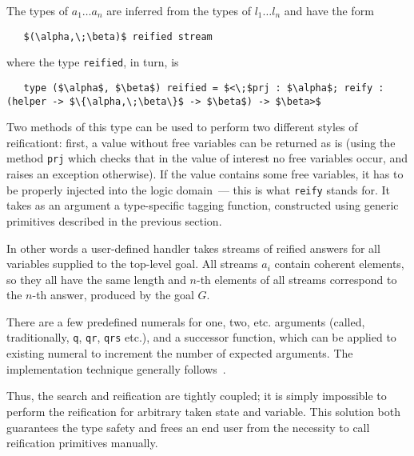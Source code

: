 The types of \mbox{$a_1\dots a_n$} are inferred from the types of \mbox{$l_1\dots l_n$} and
have the form

\begin{lstlisting}
   $(\alpha,\;\beta)$ reified stream
\end{lstlisting}

\noindent where the type \lstinline{reified}, in turn, is

\begin{lstlisting}
   type ($\alpha$, $\beta$) reified = $<\;$prj : $\alpha$; reify : (helper -> $\{\alpha,\;\beta\}$ -> $\beta$) -> $\beta>$
\end{lstlisting}

Two methods of this type can be used to perform two different styles of reificationt: first, a value without
free variables can be returned as is (using the method \lstinline{prj} which checks that in the value of
interest no free variables occur, and raises an exception otherwise). If the value contains some free
variables, it has to be properly injected into the logic domain~--- this is what \lstinline{reify} stands
for. It takes as an argument a type-specific tagging function, constructed using generic
primitives described in the previous section.

In other words a user-defined handler takes streams of reified answers for all variables supplied to the top-level
goal. All streams $a_i$ contain coherent elements, so they all have the same length and $n$-th elements of all
streams correspond to the $n$-th answer, produced by the goal $G$.

There are a few predefined numerals for one, two, etc. arguments (called, traditionally,
\lstinline{q}, \lstinline{qr}, \lstinline{qrs} etc.), and a successor function, which
can be applied to existing numeral to increment the number of expected arguments. The
implementation technique generally follows~\cite{Unparsing, DoWeNeed}.

Thus, the search and reification are tightly coupled; it is simply impossible to perform the reification 
for arbitrary taken state and variable. This solution both guarantees the type safety and frees an end
user from the necessity to call reification primitives manually.
